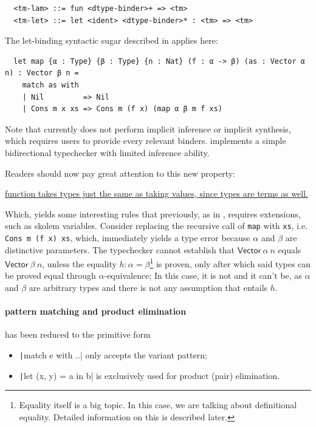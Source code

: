 \documentclass[a4paper, 11pt]{article}
\theoremstyle{remark}\newtheorem*{remark}{Remark}
\theoremstyle{definition}\newtheorem*{definition}{Definition}
\begin{document}
\begin{verbatim}
  <tm-lam> ::= fun <dtype-binder>+ => <tm>
  <tm-let> ::= let <ident> <dtype-binder>* : <tm> => <tm>
\end{verbatim}

The let-binding syntactic sugar described in \Tigris applies here:

\begin{verbatim}
  let map {α : Type} {β : Type} {n : Nat} (f : α -> β) (as : Vector α n) : Vector β n =
    match as with
    | Nil         => Nil
    | Cons m x xs => Cons m (f x) (map α β m f xs)
\end{verbatim}

Note that currently \Tigrisd does not perform implicit inference or implicit synthesis,
which requires users to provide every relevant binders. \Tigrisd
implements a simple bidirectional typechecker with limited
inference ability.

Readers should now pay great attention to this
new property:
\begin{center}
\underline{function takes types just the same as taking values, since types are terms as well.}
\end{center}
Which, yields some interesting rules that previously, as in \Tigris, requires extensions, such as
skolem variables.
Consider replacing the recursive call of \texttt{map} with \texttt{xs}, i.e. \texttt{Cons m (f x) xs},
which, immediately yields a type error because $\alpha$ and $\beta$ are distinctive parameters.
The typechecker cannot establish that $\mathsf{Vector}\ \alpha\ n$ equals $\mathsf{Vector}\ \beta\ n$, unless
the equality $h : \alpha=\beta$\footnote{
Equality itself is a big topic. In this case, we are talking about definitional equality.
Detailed information on this is described later.
}
is proven, only after which said types can be proved equal through $\alpha$-equivalence;
In this case, it is not and it can't be, as $\alpha$ and $\beta$
are arbitrary types and there is not any assumption that entails $h$.

\paragraph{pattern matching and product elimination} has been reduced to the primitive form
\begin{itemize}
\item \texttt|match e with ..| only accepts the variant pattern;
\item \texttt|let (x, y) = a in b| is exclusively used for product (pair) elimination.
\end{itemize}
\end{document}
